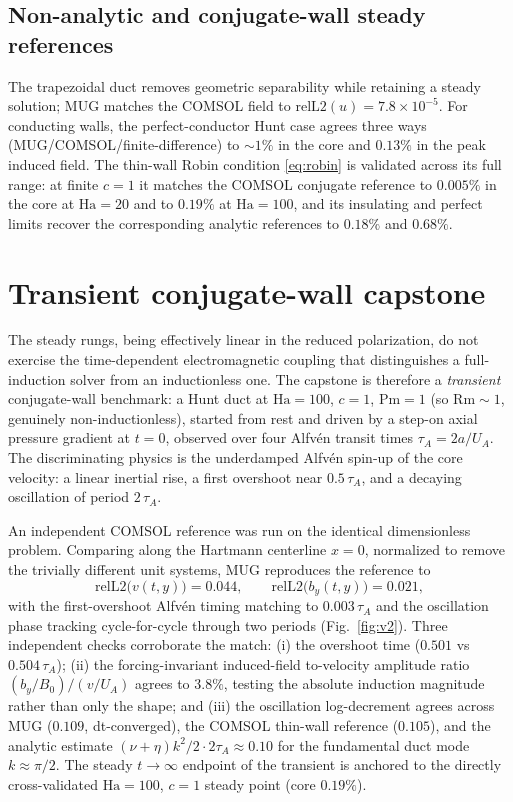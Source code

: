 \documentclass[11pt,letterpaper]{article}
\newcommand{\Ha}{\mathrm{Ha}}
\newcommand{\Rm}{\mathrm{Rm}}
\newcommand{\Pm}{\mathrm{Pm}}
\newcommand{\relL}{\mathrm{relL2}}
\newcommand{\by}{b_y}
\newcommand{\tauA}{\tau_A}
\begin{document}
\subsection{Non-analytic and conjugate-wall steady references}
The trapezoidal duct removes geometric separability while retaining a steady
solution; MUG matches the COMSOL field to $\relL(u)=7.8\times10^{-5}$. For
conducting walls, the perfect-conductor Hunt case agrees three ways
(MUG/COMSOL/finite-difference) to $\sim\!1\%$ in the core and $0.13\%$ in the peak
induced field. The thin-wall Robin condition \eqref{eq:robin} is validated across
its full range: at finite $c=1$ it matches the COMSOL conjugate reference to
$0.005\%$ in the core at $\Ha=20$ and to $0.19\%$ at $\Ha=100$, and its insulating
and perfect limits recover the corresponding analytic references to $0.18\%$ and
$0.68\%$.

\section{Transient conjugate-wall capstone}
\label{sec:v2}
The steady rungs, being effectively linear in the reduced polarization, do not
exercise the time-dependent electromagnetic coupling that distinguishes a
full-induction solver from an inductionless one. The capstone is therefore a
\emph{transient} conjugate-wall benchmark: a Hunt duct at $\Ha=100$, $c=1$,
$\Pm=1$ (so $\Rm\!\sim\!1$, genuinely non-inductionless), started from rest and
driven by a step-on axial pressure gradient at $t=0$, observed over four Alfv\'en
transit times $\tauA=2a/U_A$. The discriminating physics is the underdamped
Alfv\'en spin-up of the core velocity: a linear inertial rise, a first overshoot
near $0.5\,\tauA$, and a decaying oscillation of period $2\,\tauA$.

An independent COMSOL reference was run on the identical dimensionless problem.
Comparing along the Hartmann centerline $x=0$, normalized to remove the trivially
different unit systems, MUG reproduces the reference to
\[
  \relL\big(v(t,y)\big)=0.044,\qquad
  \relL\big(\by(t,y)\big)=0.021,
\]
with the first-overshoot Alfv\'en timing matching to $0.003\,\tauA$ and the
oscillation phase tracking cycle-for-cycle through two periods
(Fig.~\ref{fig:v2}). Three independent checks corroborate the match: (i) the
overshoot time ($0.501$ vs $0.504\,\tauA$); (ii) the forcing-invariant induced-field
to-velocity amplitude ratio $(\by/B_0)/(v/U_A)$ agrees to $3.8\%$, testing the
absolute induction magnitude rather than only the shape; and (iii) the oscillation
log-decrement agrees across MUG ($0.109$, dt-converged), the COMSOL thin-wall
reference ($0.105$), and the analytic estimate
$(\nu+\eta)k^2/2\cdot 2\tauA\approx0.10$ for the fundamental duct mode
$k\approx\pi/2$. The steady $t\!\to\!\infty$ endpoint of the transient is anchored
to the directly cross-validated $\Ha=100$, $c=1$ steady point (core $0.19\%$).
\end{document}
